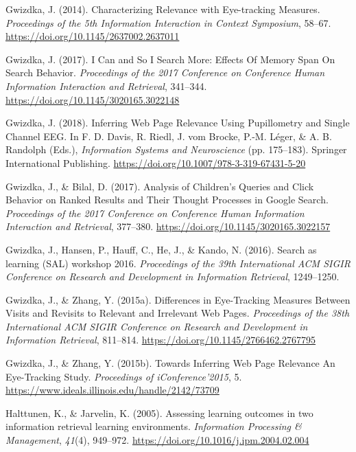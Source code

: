 \documentclass[letterpaper, nobind]{templates/ociamthesis}
\newlength{\cslhangindent}
\newenvironment{CSLReferences}[2] %
 {%
  \setlength{\parindent}{0pt}
  \ifodd #1
  \let\oldpar\par
  \def\par{\hangindent=\cslhangindent\oldpar}
  \fi
  \setlength{\parskip}{1mm}
  \setlength{\baselineskip}{6mm}
 }%
 {}
\begin{document}
\begin{CSLReferences}{1}{0}
\leavevmode{}%
Gwizdka, J. (2014). Characterizing {Relevance} with {Eye}-tracking {Measures}. \emph{Proceedings of the 5th {Information Interaction} in {Context Symposium}}, 58--67. \url{https://doi.org/10.1145/2637002.2637011}

\leavevmode{}%
Gwizdka, J. (2017). I {Can} and {So I Search More}: Effects {Of Memory Span On Search Behavior}. \emph{Proceedings of the 2017 {Conference} on {Conference Human Information Interaction} and {Retrieval}}, 341--344. \url{https://doi.org/10.1145/3020165.3022148}

\leavevmode{}%
Gwizdka, J. (2018). Inferring {Web Page Relevance Using Pupillometry} and {Single Channel EEG}. In F. D. Davis, R. Riedl, J. vom Brocke, P.-M. Léger, \& A. B. Randolph (Eds.), \emph{Information {Systems} and {Neuroscience}} (pp. 175--183). {Springer International Publishing}. \url{https://doi.org/10.1007/978-3-319-67431-5-20}

\leavevmode{}%
Gwizdka, J., \& Bilal, D. (2017). Analysis of {Children}'s {Queries} and {Click Behavior} on {Ranked Results} and {Their Thought Processes} in {Google Search}. \emph{Proceedings of the 2017 {Conference} on {Conference Human Information Interaction} and {Retrieval}}, 377--380. \url{https://doi.org/10.1145/3020165.3022157}

\leavevmode{}%
Gwizdka, J., Hansen, P., Hauff, C., He, J., \& Kando, N. (2016). Search as learning (SAL) workshop 2016. \emph{Proceedings of the 39th International ACM SIGIR Conference on Research and Development in Information Retrieval}, 1249--1250.

\leavevmode{}%
Gwizdka, J., \& Zhang, Y. (2015a). Differences in {Eye}-{Tracking Measures Between Visits} and {Revisits} to {Relevant} and {Irrelevant Web Pages}. \emph{Proceedings of the 38th {International ACM SIGIR Conference} on {Research} and {Development} in {Information Retrieval}}, 811--814. \url{https://doi.org/10.1145/2766462.2767795}

\leavevmode{}%
Gwizdka, J., \& Zhang, Y. (2015b). Towards {Inferring Web Page Relevance} \textendash{} {An Eye}-{Tracking Study}. \emph{Proceedings of {iConference}'2015}, 5. \url{https://www.ideals.illinois.edu/handle/2142/73709}

\leavevmode{}%
Halttunen, K., \& Jarvelin, K. (2005). Assessing learning outcomes in two information retrieval learning environments. \emph{Information Processing \& Management}, \emph{41}(4), 949--972. \url{https://doi.org/10.1016/j.ipm.2004.02.004}


\end{CSLReferences}
\end{document}
